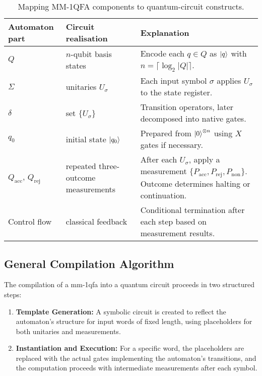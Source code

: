 \vspace{6pt}
\begin{table}[H]
\centering
\footnotesize
\begin{tabularx}{\textwidth}{>{\raggedright\arraybackslash}p{}%
                        >{\raggedright\arraybackslash}p{}X}
\toprule
\textbf{Automaton part} & \textbf{Circuit realisation} & \textbf{Explanation} \\
\midrule
$Q$ & $n$-qubit basis states & Encode each $q \in Q$ as $\ket{q}$ with $n = \lceil \log_2 |Q| \rceil$. \\

$\Sigma$ & unitaries $U_\sigma$ & Each input symbol $\sigma$ applies $U_\sigma$ to the state register. \\

$\delta$ & set $\{U_\sigma\}$ & Transition operators, later decomposed into native gates. \\

$q_0$ & initial state $\ket{q_0}$ & Prepared from $\ket{0}^{\otimes n}$ using $X$ gates if necessary. \\

$Q_{\text{acc}}$, $Q_{\text{rej}}$ & repeated three-outcome measurements & After each $U_\sigma$, apply a measurement $\{P_{\text{acc}}, P_{\text{rej}}, P_{\text{non}}\}$. Outcome determines halting or continuation. \\

Control flow & classical feedback & Conditional termination after each step based on measurement results. \\
\bottomrule
\end{tabularx}
\caption{Mapping MM-1QFA components to quantum-circuit constructs.}
\label{tab:mmqfa-mapping}
\end{table}

\subsection{General Compilation Algorithm}
\label{sec:mmqfa-algorithm}

The compilation of a \gls{mm-1qfa} into a quantum circuit proceeds in two structured steps:
\begin{enumerate}
    \item \textbf{Template Generation:} A symbolic circuit is created to reflect the automaton's structure for input words of fixed length, using placeholders for both unitaries and measurements.
    \item \textbf{Instantiation and Execution:} For a specific word, the placeholders are replaced with the actual gates implementing the automaton's transitions, and the computation proceeds with intermediate measurements after each symbol.
\end{enumerate}

